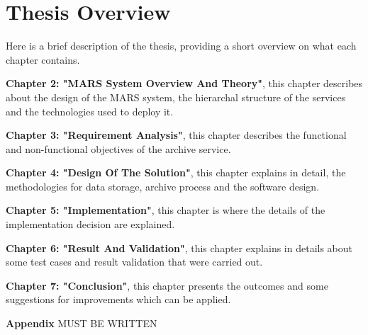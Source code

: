    

    \section{Thesis Overview}
        Here is a brief description of the thesis, providing a short overview on what each
        chapter contains.
        
        \par
        \textbf{Chapter 2: "MARS System Overview And Theory"}, this chapter describes about the design
        of the MARS system, the hierarchal structure of the services and the technologies used to
        deploy it.

        \par
        \textbf{Chapter 3: "Requirement Analysis"}, this chapter describes the functional and
        non-functional objectives of the archive service.

        \par
        \textbf{Chapter 4: "Design Of The Solution"}, this chapter explains in detail, the 
        methodologies for data storage, archive process and the software design.

        \par
        \textbf{Chapter 5: "Implementation"}, this chapter is where the details of the 
        implementation decision are explained.

        \par
        \textbf{Chapter 6: "Result And Validation"}, this chapter explains in details about 
        some test cases and result validation that were carried out.

        \par
        \textbf{Chapter 7: "Conclusion"}, this chapter presents the outcomes and some 
        suggestions for improvements which can be applied.
        
        \par
        \textbf{Appendix}
        MUST BE WRITTEN

